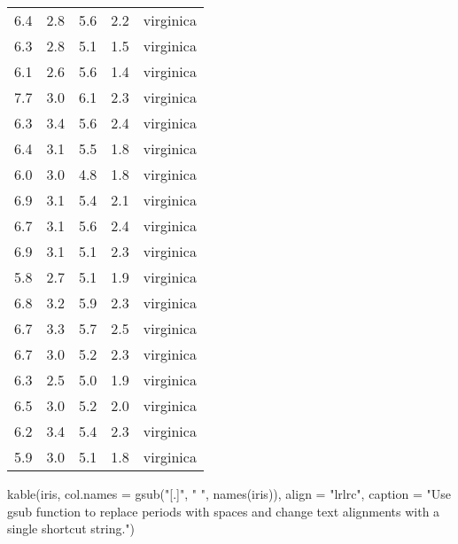 \documentclass[
  letterpaper,
  DIV=11,
  numbers=noendperiod]{scrartcl}
\newenvironment{Shaded}{\begin{snugshade}}{\end{snugshade}}
\newcommand{\AttributeTok}[1]{\textcolor[rgb]{0.40,0.45,0.13}{#1}}
\newcommand{\FunctionTok}[1]{\textcolor[rgb]{0.28,0.35,0.67}{#1}}
\newcommand{\NormalTok}[1]{\textcolor[rgb]{0.00,0.23,0.31}{#1}}
\newcommand{\StringTok}[1]{\textcolor[rgb]{0.13,0.47,0.30}{#1}}
\begin{document}
\begin{longtable}[]{@{}lrlrc@{}}
6.4 & 2.8 & 5.6 & 2.2 & virginica \\
6.3 & 2.8 & 5.1 & 1.5 & virginica \\
6.1 & 2.6 & 5.6 & 1.4 & virginica \\
7.7 & 3.0 & 6.1 & 2.3 & virginica \\
6.3 & 3.4 & 5.6 & 2.4 & virginica \\
6.4 & 3.1 & 5.5 & 1.8 & virginica \\
6.0 & 3.0 & 4.8 & 1.8 & virginica \\
6.9 & 3.1 & 5.4 & 2.1 & virginica \\
6.7 & 3.1 & 5.6 & 2.4 & virginica \\
6.9 & 3.1 & 5.1 & 2.3 & virginica \\
5.8 & 2.7 & 5.1 & 1.9 & virginica \\
6.8 & 3.2 & 5.9 & 2.3 & virginica \\
6.7 & 3.3 & 5.7 & 2.5 & virginica \\
6.7 & 3.0 & 5.2 & 2.3 & virginica \\
6.3 & 2.5 & 5.0 & 1.9 & virginica \\
6.5 & 3.0 & 5.2 & 2.0 & virginica \\
6.2 & 3.4 & 5.4 & 2.3 & virginica \\
5.9 & 3.0 & 5.1 & 1.8 & virginica \\

\end{longtable}

\begin{Shaded}
\begin{Highlighting}[]
\FunctionTok{kable}\NormalTok{(iris, }
      \AttributeTok{col.names =} \FunctionTok{gsub}\NormalTok{(}\StringTok{"[.]"}\NormalTok{, }\StringTok{" "}\NormalTok{, }\FunctionTok{names}\NormalTok{(iris)), }
      \AttributeTok{align =} \StringTok{"lrlrc"}\NormalTok{,}
      \AttributeTok{caption =} \StringTok{"Use \textquotesingle{}gsub\textquotesingle{} function to replace periods with spaces and change text alignments with a single \textquotesingle{}shortcut\textquotesingle{} string."}\NormalTok{)}
\end{Highlighting}
\end{Shaded}
\end{document}
